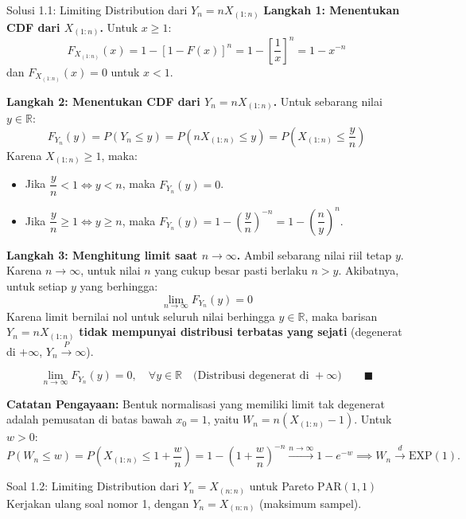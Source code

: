 \documentclass[10pt,twoside]{article}
\begin{document}
\begin{solbox}{Solusi 1.1: Limiting Distribution dari $Y_n = n X_{(1:n)}$}
\textbf{Langkah 1: Menentukan CDF dari $X_{(1:n)}$.}
Untuk $x \ge 1$:
\[
F_{X_{(1:n)}}(x) = 1 - [1 - F(x)]^n = 1 - \left[\frac{1}{x}\right]^n = 1 - x^{-n}
\]
dan $F_{X_{(1:n)}}(x) = 0$ untuk $x < 1$.

\textbf{Langkah 2: Menentukan CDF dari $Y_n = n X_{(1:n)}$.}
Untuk sebarang nilai $y \in \mathbb{R}$:
\[
F_{Y_n}(y) = P(Y_n \le y) = P\left(n X_{(1:n)} \le y\right) = P\left(X_{(1:n)} \le \frac{y}{n}\right)
\]
Karena $X_{(1:n)} \ge 1$, maka:
\begin{itemize}
  \item Jika $\dfrac{y}{n} < 1 \iff y < n$, maka $F_{Y_n}(y) = 0$.
  \item Jika $\dfrac{y}{n} \ge 1 \iff y \ge n$, maka $F_{Y_n}(y) = 1 - \left(\dfrac{y}{n}\right)^{-n} = 1 - \left(\dfrac{n}{y}\right)^n$.
\end{itemize}

\textbf{Langkah 3: Menghitung limit saat $n \to \infty$.}
Ambil sebarang nilai riil tetap $y$. Karena $n \to \infty$, untuk nilai $n$ yang cukup besar pasti berlaku $n > y$. Akibatnya, untuk setiap $y$ yang berhingga:
\[
\lim_{n \to \infty} F_{Y_n}(y) = 0
\]
Karena limit bernilai nol untuk seluruh nilai berhingga $y \in \mathbb{R}$, maka barisan $Y_n = n X_{(1:n)}$ \textbf{tidak mempunyai distribusi terbatas yang sejati} (degenerat di $+\infty$, $Y_n \xrightarrow{P} \infty$).

\[
\boxed{\lim_{n \to \infty} F_{Y_n}(y) = 0, \quad \forall y \in \mathbb{R} \quad \text{(Distribusi degenerat di }+\infty\text{)}} \qquad \blacksquare
\]

\textbf{Catatan Pengayaan:}
Bentuk normalisasi yang memiliki limit tak degenerat adalah pemusatan di batas bawah $x_0 = 1$, yaitu $W_n = n(X_{(1:n)} - 1)$. Untuk $w > 0$:
\[
P(W_n \le w) = P\left(X_{(1:n)} \le 1 + \frac{w}{n}\right) = 1 - \left(1 + \frac{w}{n}\right)^{-n} \xrightarrow{n \to \infty} 1 - e^{-w} \implies W_n \xrightarrow{d} \text{EXP}(1).
\]
\end{solbox}

\begin{soalbox}{Soal 1.2: Limiting Distribution dari $Y_n = X_{(n:n)}$ untuk Pareto $\text{PAR}(1,1)$}
Kerjakan ulang soal nomor 1, dengan $Y_n = X_{(n:n)}$ (maksimum sampel).
\end{soalbox}
\end{document}
